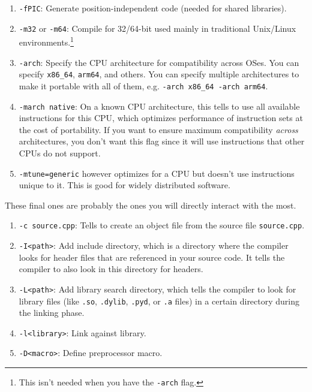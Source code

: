 \documentclass{article}
\newcounter{definition}[section]
\newcounter{code}[section]
\begin{document}
      \begin{definition}
        \label{def:architecture-platform}
        \begin{enumerate}
          \item \texttt{-fPIC}: Generate position-independent code (needed for shared libraries). 
          \item \texttt{-m32} or \texttt{-m64}: Compile for 32/64-bit used mainly in traditional Unix/Linux environments.\footnote{This isn't needed when you have the \texttt{-arch} flag.}
          \item \texttt{-arch}: Specify the CPU architecture for compatibility across OSes. You can specify \texttt{x86\_64}, \texttt{arm64}, and others. You can specify multiple architectures to make it portable with all of them, e.g. \texttt{-arch x86\_64 -arch arm64}. 
          \item \texttt{-march native}: On a known CPU architecture, this tells to use all available instructions for this CPU, which optimizes performance of instruction sets at the cost of portability. If you want to ensure maximum compatibility \textit{across} architectures, you don't want this flag since it will use instructions that other CPUs do not support. 
          \item \texttt{-mtune=generic} however optimizes for a CPU but doesn't use instructions unique to it. This is good for widely distributed software. 
        \end{enumerate}
      \end{definition}

      \begin{definition}
        \label{def:include-paths-and-linking}
        These final ones are probably the ones you will directly interact with the most. 
        \begin{enumerate}
          \item \texttt{-c source.cpp}: Tells to create an object file from the source file \texttt{source.cpp}. 
          \item \texttt{-I<path>}: Add include directory, which is a directory where the compiler looks for header files that are referenced in your source code. It tells the compiler to also look in this directory for headers. 
          \item \texttt{-L<path>}: Add library search directory, which tells the compiler to look for library files (like \texttt{.so}, \texttt{.dylib}, \texttt{.pyd}, or \texttt{.a} files) in a certain directory during the linking phase. 
          \item \texttt{-l<library>}: Link against library. 
          \item \texttt{-D<macro>}: Define preprocessor macro. 
        \end{enumerate}
      \end{definition}
\end{document}
